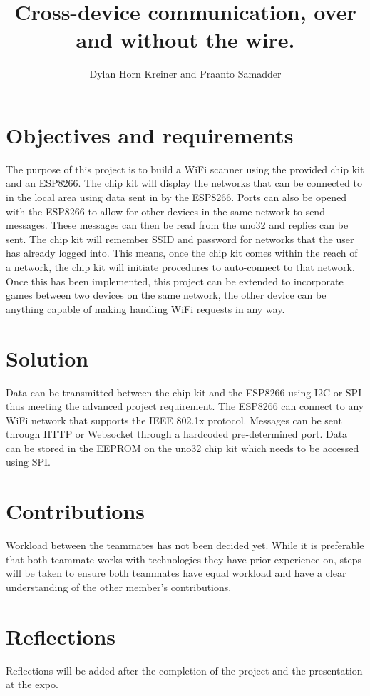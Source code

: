 \documentclass{article}
\title{Cross-device communication, over and without the wire.}
\author{Dylan Horn Kreiner and Praanto Samadder}
\begin{document}
\maketitle

\section{Objectives and requirements}
The purpose of this project is to build a WiFi scanner using the provided chip kit and an ESP8266.
The chip kit will display the networks that can be connected to in the local area using data sent in by the ESP8266.
Ports can also be opened with the ESP8266 to allow for other devices in the same network to send messages.
These messages can then be read from the uno32 and replies can be sent.
The chip kit will remember SSID and password for networks that the user has already logged into. This means, once the chip kit comes within the reach of a network, the chip kit will initiate procedures to auto-connect to that network.
Once this has been implemented, this project can be extended to incorporate games between two devices on the same network, the other device can be anything capable of making handling WiFi requests in any way.

\section{Solution}
Data can be transmitted between the chip kit and the ESP8266 using I2C or SPI thus meeting the advanced project requirement.
The ESP8266 can connect to any WiFi network that supports the IEEE 802.1x protocol.
Messages can be sent through HTTP or Websocket through a hardcoded pre-determined port.
Data can be stored in the EEPROM on the uno32 chip kit which needs to be accessed using SPI.

\section{Contributions}
Workload between the teammates has not been decided yet. While it is preferable that both teammate works with technologies they have prior experience on, steps will be taken to ensure both teammates have equal workload and have a clear understanding of the other member's contributions.

\section{Reflections}
Reflections will be added after the completion of the project and the presentation at the expo.
\end{document}
